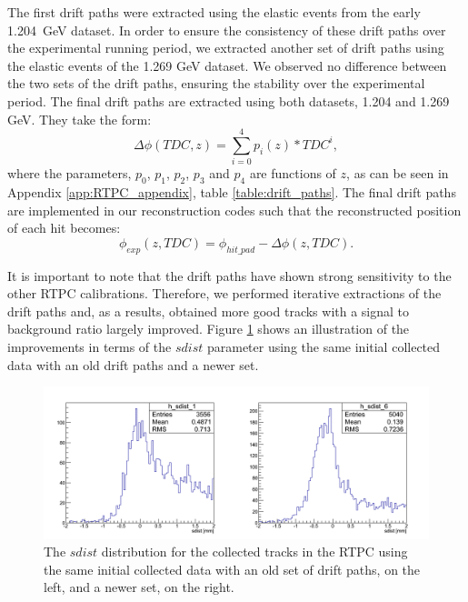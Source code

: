 The first drift paths were extracted using the elastic events from the early 
1.204~GeV dataset. In order to ensure the consistency of these drift paths over 
the experimental running period, we extracted another set of drift paths using 
the elastic events of the 1.269 GeV dataset. We observed no difference between the 
two sets of the drift paths, ensuring the stability over the experimental 
period. The final drift paths are 
extracted using both datasets, 1.204 and 1.269 GeV. They take the form:
\vspace{-0.1in}
\begin{equation}
\Delta \phi (TDC, z)=  \sum\limits_{i=0}^{4} p_{i}(z)*TDC^{i},
\end{equation}
where the parameters, $p_{0}$, $p_{1}$, $p_{2}$, $p_{3}$ and $p_{4}$ are 
functions of $z$, as can be seen in Appendix \ref{app:RTPC_appendix}, table 
\ref{table:drift_paths}. The final drift paths are implemented in our 
reconstruction codes such that the reconstructed position of each hit becomes:
\begin{equation}
\phi_{exp}(z, TDC) = \phi _{hit\_pad} - \Delta \phi (z, TDC).
\end{equation} 

It is important to note that the drift paths have shown strong sensitivity 
to the other RTPC calibrations. Therefore, we performed iterative extractions 
of the drift paths and, as a results, obtained more good tracks with a signal 
to background ratio largely improved. Figure \ref{fig:sdist_comp_pass1v1_v6} 
shows an illustration of the improvements in terms of the $sdist$ parameter 
using the same initial collected data with an old drift paths and a newer set.

\begin{figure}[tp]
\centering
\includegraphics[scale=0.38]{fig_rtpc/sdist_comp_pass1_v1_v6.png}
\caption{The $sdist$ distribution for the collected tracks in the RTPC using 
the same initial collected data with an old set of drift paths, on the left, 
and a newer set, on the right.}
\label{fig:sdist_comp_pass1v1_v6}
\end{figure}

